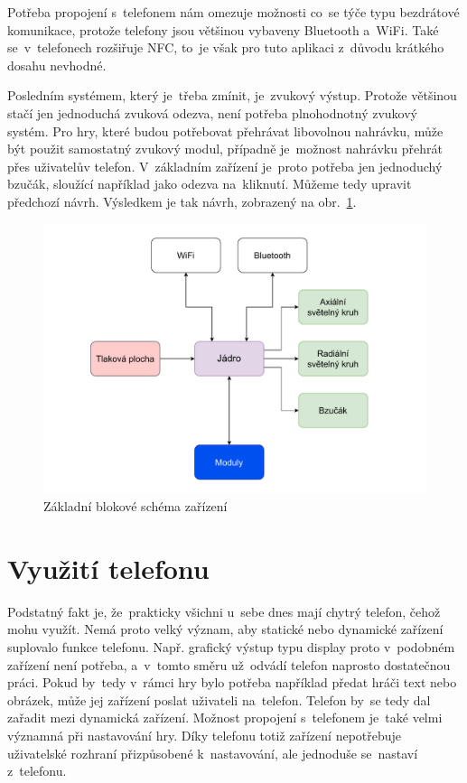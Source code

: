 Potřeba propojení s~telefonem nám omezuje možnosti co~se týče typu bezdrátové komunikace, protože telefony jsou většinou vybaveny Bluetooth a~WiFi.
Také se~v~telefonech rozšiřuje NFC, to~je však pro tuto aplikaci z~důvodu krátkého dosahu nevhodné.

Posledním systémem, který je~třeba zmínit, je~zvukový výstup.
Protože většinou stačí jen jednoduchá zvuková odezva, není potřeba plnohodnotný zvukový systém.
Pro hry, které budou potřebovat přehrávat libovolnou nahrávku, může být použit samostatný zvukový modul, případně je~možnost nahrávku přehrát přes uživatelův telefon.
V~základním zařízení je~proto potřeba jen jednoduchý bzučák, sloužící například jako odezva na~kliknutí.
Můžeme tedy upravit předchozí návrh.
Výsledkem je tak návrh, zobrazený na obr.~\ref{fig:diagram_zanoreni_1}.
\begin{figure}[h]
    \centering
    \includegraphics[width=\textwidth]{text/TeoretickyUvod/AplikaceHernichZarizeni/diagram/zanoreni_1.pdf}
    \caption{Základní blokové schéma zařízení}
    \label{fig:diagram_zanoreni_1}
\end{figure}

\section{Využití telefonu \label{VyuzitiTelefonu}}
Podstatný fakt je, že~prakticky všichni u~sebe dnes mají chytrý telefon, čehož mohu využít.
Nemá proto velký význam, aby statické nebo dynamické zařízení suplovalo funkce telefonu.
Např. grafický výstup typu display proto v~podobném zařízení není potřeba, a~v~tomto směru už~odvádí telefon naprosto dostatečnou práci.
Pokud by~tedy v~rámci hry bylo potřeba například předat hráči text nebo obrázek, může jej zařízení poslat uživateli na~telefon.
Telefon by~se tedy dal zařadit mezi dynamická zařízení.
Možnost propojení s~telefonem je~také velmi významná při nastavování hry.
Díky telefonu totiž zařízení nepotřebuje uživatelské rozhraní přizpůsobené k~nastavování, ale jednoduše se~nastaví z~telefonu.

